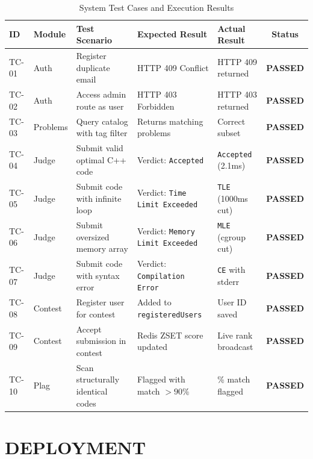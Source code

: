 \documentclass[12pt,a4paper]{report}
\begin{document}
\begin{table}[H]
\centering
\footnotesize
\setlength{\tabcolsep}{3pt}
\renewcommand{\arraystretch}{1.2}
\caption{System Test Cases and Execution Results}
\label{tab:test_cases}
\begin{tabularx}{\textwidth}{@{}l l >{\raggedright\arraybackslash}p{3.2cm} >{\raggedright\arraybackslash}X >{\raggedright\arraybackslash}p{2.6cm} c@{}}
\toprule
\textbf{ID} & \textbf{Module} & \textbf{Test Scenario} & \textbf{Expected Result} & \textbf{Actual Result} & \textbf{Status} \\ \midrule
TC-01 & Auth & Register duplicate email & HTTP 409 Conflict & HTTP 409 returned & \textbf{PASSED} \\
TC-02 & Auth & Access admin route as user & HTTP 403 Forbidden & HTTP 403 returned & \textbf{PASSED} \\
TC-03 & Problems & Query catalog with tag filter & Returns matching problems & Correct subset & \textbf{PASSED} \\
TC-04 & Judge & Submit valid optimal C++ code & Verdict: \texttt{Accepted} & \texttt{Accepted} (2.1ms) & \textbf{PASSED} \\
TC-05 & Judge & Submit code with infinite loop & Verdict: \texttt{Time Limit Exceeded} & \texttt{TLE} (1000ms cut) & \textbf{PASSED} \\
TC-06 & Judge & Submit oversized memory array & Verdict: \texttt{Memory Limit Exceeded} & \texttt{MLE} (cgroup cut) & \textbf{PASSED} \\
TC-07 & Judge & Submit code with syntax error & Verdict: \texttt{Compilation Error} & \texttt{CE} with stderr & \textbf{PASSED} \\
TC-08 & Contest & Register user for contest & Added to \texttt{registeredUsers} & User ID saved & \textbf{PASSED} \\
TC-09 & Contest & Accept submission in contest & Redis ZSET score updated & Live rank broadcast & \textbf{PASSED} \\
TC-10 & Plag & Scan structurally identical codes & Flagged with match $>90\%$ & 94.2\% match flagged & \textbf{PASSED} \\ \bottomrule
\end{tabularx}
\end{table}

\clearpage

\chapter{DEPLOYMENT}
\end{document}
